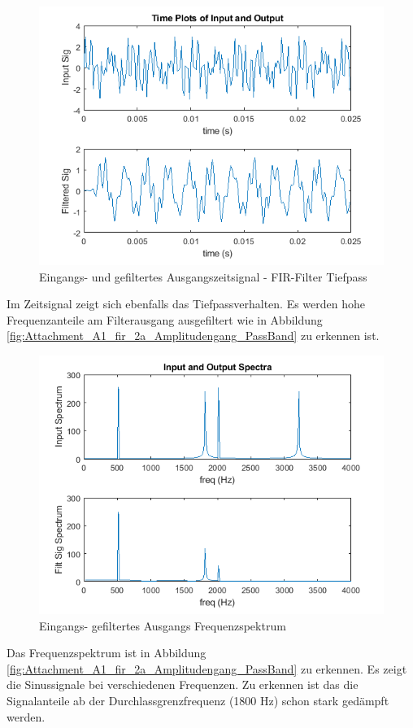 \newpage

\begin{figure}[H]
	\centering
	\includegraphics[width=0.75\linewidth]{Bilder/Attachment_A1_fir_2a_Timeplot}
	\caption{Eingangs- und gefiltertes Ausgangszeitsignal  - FIR-Filter Tiefpass}
	\label{fig:Attachment_A1_fir_2a_Timeplot}
	\vspace{-10pt}
\end{figure}

\noindent Im Zeitsignal zeigt sich ebenfalls das Tiefpassverhalten. Es werden hohe Frequenzanteile am Filterausgang ausgefiltert wie in Abbildung \ref{fig:Attachment_A1_fir_2a_Amplitudengang_PassBand} zu erkennen ist.

\begin{figure}[H]
	\centering
	\includegraphics[width=0.75\linewidth]{Bilder/Attachment_A1_fir_2a_Spektrum}
	\caption{Eingangs- gefiltertes Ausgangs Frequenzspektrum}
	\label{fig:Attachment_A1_fir_2a_Spektrum}
	\vspace{-10pt}
\end{figure}

\noindent Das Frequenzspektrum ist in Abbildung \ref{fig:Attachment_A1_fir_2a_Amplitudengang_PassBand} zu erkennen. Es zeigt die Sinussignale bei verschiedenen Frequenzen. Zu erkennen ist das die Signalanteile ab der Durchlassgrenzfrequenz (1800 Hz) schon stark gedämpft werden.

